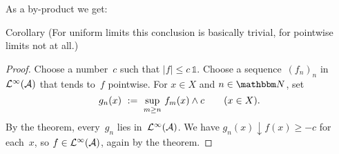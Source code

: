 \documentclass[main.tex]{subfiles}
\begin{document}
%
%
\noindent As a by-product we get:
\begin{psec}{6.15}{Corollary}
(For uniform limits this conclusion is basically trivial,
for pointwise limits not at all.)
\end{psec}
\begin{proof}
Choose a number~$c$ such that $|f|\leq c\,\mathbb{1}$.
Choose a sequence~$(f_n)_n$ in~$\mathcal{L}^\infty(\mathcal A)$
that tends to~$f$ pointwise.
For $x\in X$ and $n\in \N$,
set 
\begin{equation*}
g_n(x)\ :=\ \cramped{\sup_{m\geq n}} \ f_m(x)\wedge c\qquad(x\in X)\htam{.}
\end{equation*}
By the theorem,
every~$g_n$ lies in~$\mathcal{L}^\infty(\mathcal A)$.
We have $g_n(x)\downarrow f(x)\geq -c$
for each~$x$,
so $f\in\mathcal{L}^\infty(\mathcal A)$,
again by the theorem. \xqed
\end{proof}
%
%
\end{document}
